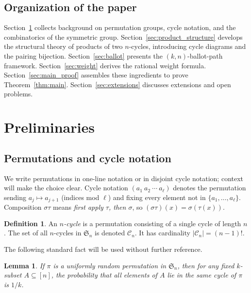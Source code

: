 \documentclass[12pt,a4paper]{article}
\newtheorem{lemma}[theorem]{Lemma}
\theoremstyle{definition}
\newtheorem{definition}[theorem]{Definition}
\newcommand{\Sn}{\mathfrak{S}_n}
\newcommand{\Cn}{\mathcal{C}_n}
\newcommand{\abs}[1]{\lvert #1 \rvert}
\begin{document}
\subsection{Organization of the paper}

Section~\ref{sec:prelim} collects background on permutation groups,
cycle notation, and the combinatorics of the symmetric group.
Section~\ref{sec:product_structure} develops the structural theory of
products of two $n$-cycles, introducing cycle diagrams and the
pairing bijection.  Section~\ref{sec:ballot} presents the
$(k,n)$-ballot-path framework.  Section~\ref{sec:weight} derives the
rational weight formula.  Section~\ref{sec:main_proof} assembles these
ingredients to prove Theorem~\ref{thm:main}.  Section~\ref{sec:extensions}
discusses extensions and open problems.

\section{Preliminaries}
\label{sec:prelim}

\subsection{Permutations and cycle notation}

We write permutations in one-line notation or in disjoint cycle notation;
context will make the choice clear.  Cycle notation $(a_1\ a_2\ \cdots\ a_\ell)$
denotes the permutation sending $a_j\mapsto a_{j+1}$ (indices mod $\ell$)
and fixing every element not in $\{a_1,\dots,a_\ell\}$.  Composition
$\sigma\tau$ means \emph{first apply $\tau$, then $\sigma$}, so
$(\sigma\tau)(x)=\sigma(\tau(x))$.

\begin{definition}
An \emph{$n$-cycle} is a permutation consisting of a single cycle of
length $n$.  The set of all $n$-cycles in $\Sn$ is denoted $\Cn$.
It has cardinality $\abs{\Cn}=(n-1)!$.
\end{definition}

The following standard fact will be used without further reference.

\begin{lemma}
\label{lem:uniform}
If $\pi$ is a uniformly random permutation in $\Sn$, then for any
fixed $k$-subset $A\subseteq[n]$, the probability that all elements
of $A$ lie in the same cycle of $\pi$ is $1/k$.
\end{lemma}
\end{document}
